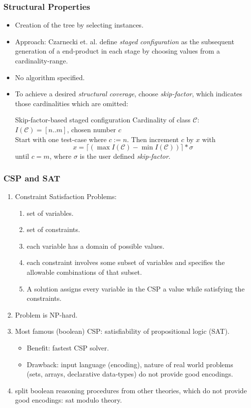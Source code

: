 \documentclass[swedish]{beamer}
\begin{document}
 \begin{frame}
  \frametitle{Structural Properties}
  \begin{itemize}
   \item Creation of the tree by selecting instances.
   \item Approach: Czarnecki et. al. define \emph{staged configuration} as the subsequent generation of a end-product in each stage by choosing values from a cardinality-range.
   
   \item No algorithm specified.
   \item To achieve a desired \emph{structural coverage}, choose \emph{skip-factor}, which indicates those cardinalities which are omitted:
   \begin{block}{Skip-factor-based staged configuration}
   Cardinality of class $\mathcal{C}$: $I(\mathcal{C})=[n..m]$, chosen number $c$\\
   Start with one test-case where $c := n$.
   Then increment $c$ by $x$ with
   \[
   x = \lceil (\max{I(\mathcal{C})}-\min{I(\mathcal{C})}) \rceil * \sigma
   \]
   until $c = m$, where $\sigma$ is the user defined \emph{skip-factor}.
   \end{block}
  \end{itemize}
 \end{frame}
 
 \begin{frame}
  \frametitle{CSP and SAT}
  \begin{enumerate}
   \item Constraint Satisfaction Problems:
    \begin{enumerate}
     \item set of variables.
     \item set of constraints.
     \item each variable has a domain of possible values.
     \item each constraint involves some subset of variables and specifies the allowable combinations of that subset.
     \item A solution assigns every variable in the CSP a value while satisfying the constraints.
    \end{enumerate}
   \item Problem is NP-hard.
   \item Most famous (boolean) CSP: satisfiability of propositional logic (SAT).
    \begin{itemize}
     \item Benefit: fastest CSP solver.
     \item Drawback: input language (encoding), nature of real world problems (sets, arrays, declarative data-types) do not provide good encodings.
    \end{itemize}
   \item split boolean reasoning procedures from other theories, which do not provide good encodings: sat modulo theory.
  \end{enumerate}
 \end{frame}
 
\end{document}
